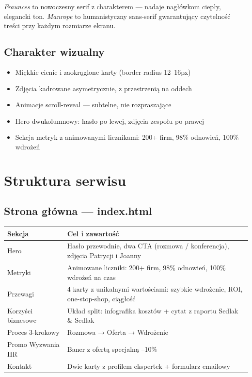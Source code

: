 \documentclass[12pt,a4paper]{article}
\begin{document}
\vspace{0.4cm}
\textit{Fraunces} to nowoczesny serif z charakterem — nadaje nagłówkom ciepły, elegancki ton. \textit{Manrope} to humanistyczny sans-serif gwarantujący czytelność treści przy każdym rozmiarze ekranu.

\vspace{0.8cm}
\subsection{Charakter wizualny}

\begin{itemize}[leftmargin=1.5em]
  \item Miękkie cienie i zaokrąglone karty (border-radius 12–16px)
  \item Zdjęcia kadrowane asymetrycznie, z przestrzenią na oddech
  \item Animacje scroll-reveal — subtelne, nie rozpraszające
  \item Hero dwukolumnowy: hasło po lewej, zdjęcia zespołu po prawej
  \item Sekcja metryk z animowanymi licznikami: 200+ firm, 98\% odnowień, 100\% wdrożeń
\end{itemize}

\newpage

\section{Struktura serwisu}

\subsection{Strona główna — index.html}

\begin{tabularx}{\textwidth}{@{} p{4cm} X @{}}
  \toprule
  \rowcolor{surface}
  \textbf{Sekcja} & \textbf{Cel i zawartość} \\
  \midrule
  Hero & Hasło przewodnie, dwa CTA (rozmowa / konferencja), zdjęcia Patrycji i Joanny \\
  \rowcolor{surface}
  Metryki & Animowane liczniki: 200+ firm, 98\% odnowień, 100\% wdrożeń na czas \\
  Przewagi & 4 karty z unikalnymi wartościami: szybkie wdrożenie, ROI, one-stop-shop, ciągłość \\
  \rowcolor{surface}
  Korzyści biznesowe & Układ split: infografika kosztów + cytat z raportu Sedlak \& Sedlak \\
  Proces 3-krokowy & Rozmowa → Oferta → Wdrożenie \\
  \rowcolor{surface}
  Promo Wyzwania HR & Baner z ofertą specjalną --10\% \\
  Kontakt & Dwie karty z profilem ekspertek + formularz emailowy \\
  \bottomrule
\end{tabularx}
\end{document}
